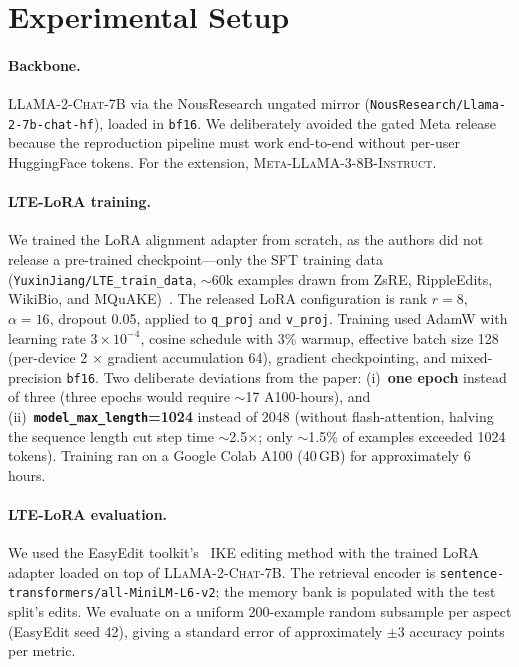\documentclass[11pt,a4paper,twocolumn]{article}
\begin{document}
\section{Experimental Setup}
\label{sec:setup}

\paragraph{Backbone.} \textsc{LLaMA-2-Chat-7B} via the NousResearch ungated mirror (\texttt{NousResearch/Llama-2-7b-chat-hf}), loaded in \texttt{bf16}. We deliberately avoided the gated Meta release because the reproduction pipeline must work end-to-end without per-user HuggingFace tokens. For the extension, \textsc{Meta-LLaMA-3-8B-Instruct}.

\paragraph{LTE-LoRA training.} We trained the LoRA alignment adapter from scratch, as the authors did not release a pre-trained checkpoint---only the SFT training data (\texttt{YuxinJiang/LTE\_train\_data}, ${\sim}$60k examples drawn from ZsRE, RippleEdits, WikiBio, and MQuAKE)~\citep{cohen2023ripple}. The released LoRA configuration is rank $r{=}8$, $\alpha{=}16$, dropout 0.05, applied to \texttt{q\_proj} and \texttt{v\_proj}. Training used AdamW with learning rate $3{\times}10^{-4}$, cosine schedule with 3\% warmup, effective batch size 128 (per-device 2 $\times$ gradient accumulation 64), gradient checkpointing, and mixed-precision \texttt{bf16}. Two deliberate deviations from the paper: (i)~\textbf{one epoch} instead of three (three epochs would require ${\sim}$17 A100-hours), and (ii)~\textbf{\texttt{model\_max\_length}=1024} instead of 2048 (without flash-attention, halving the sequence length cut step time ${\sim}$2.5$\times$; only ${\sim}$1.5\% of examples exceeded 1024 tokens). Training ran on a Google Colab A100 (40\,GB) for approximately 6 hours.

\paragraph{LTE-LoRA evaluation.} We used the EasyEdit toolkit's~\citep{wang2024easyedit} IKE editing method with the trained LoRA adapter loaded on top of \textsc{LLaMA-2-Chat-7B}. The retrieval encoder is \texttt{sentence-transformers/all-MiniLM-L6-v2}; the memory bank is populated with the test split's edits. We evaluate on a uniform 200-example random subsample per aspect (EasyEdit seed 42), giving a standard error of approximately $\pm 3$ accuracy points per metric.
\end{document}
